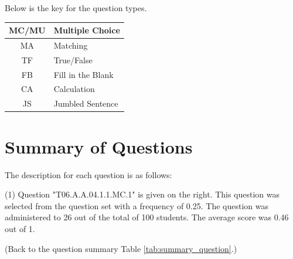 \documentclass[12pt,nohyper]{tufte-handout}\usepackage[]{graphicx}\usepackage[]{color}
\begin{document}
Below is the key for the question types.
\begin{center}
\begin{tabular}{c|l}
\hline
MC/MU & Multiple Choice \\
\hline
MA & Matching \\
\hline
TF & True/False \\
\hline
FB & Fill in the Blank \\
\hline
CA & Calculation \\
\hline
JS & Jumbled Sentence \\
\hline
\end{tabular}
\end{center}


\clearpage
\newpage{}
\section{Summary of Questions}
The description for each question is as follows:

 (1) Question "T06.A.A.04.1.1.MC.1" is given on the right. This question was selected from the question set with a frequency of 0.25. The question was administered to 26 out of the total of 100 students. The average score was 0.46 out of 1.

 (Back to the question summary Table \ref{tab:summary_question}.)
\end{document}
